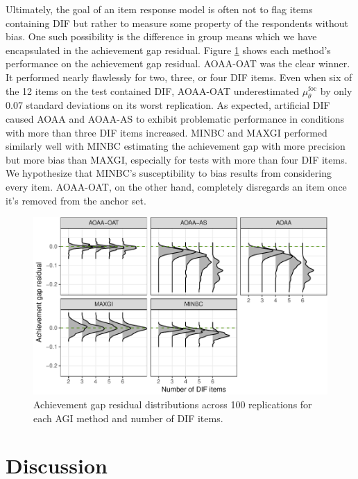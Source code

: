\documentclass[
  english,
  man,floatsintext]{apa6}
\begin{document}
Ultimately, the goal of an item response model is often not to flag items containing DIF but rather to measure some property of the respondents without bias. One such possibility is the difference in group means which we have encapsulated in the achievement gap residual. Figure \ref{fig:achievegap} shows each method's performance on the achievement gap residual. AOAA-OAT was the clear winner. It performed nearly flawlessly for two, three, or four DIF items. Even when six of the 12 items on the test contained DIF, AOAA-OAT underestimated \(\mu_\theta^\text{foc}\) by only 0.07 standard deviations on its worst replication. As expected, artificial DIF caused AOAA and AOAA-AS to exhibit problematic performance in conditions with more than three DIF items increased. MINBC and MAXGI performed similarly well with MINBC estimating the achievement gap with more precision but more bias than MAXGI, especially for tests with more than four DIF items. We hypothesize that MINBC's susceptibility to bias results from considering every item. AOAA-OAT, on the other hand, completely disregards an item once it's removed from the anchor set.

\begin{figure}[h]

{\centering \includegraphics{paper_apa_files/figure-latex/achievegap-1}

}

\caption{Achievement gap residual distributions across 100 replications for each AGI method and number of DIF items.}\label{fig:achievegap}
\end{figure}

\hypertarget{discussion}{%
\section{Discussion}\label{discussion}}
\end{document}
